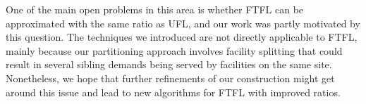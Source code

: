 \documentclass[preprint,12pt]{elsarticle}
\begin{document}
One of the main open problems in this area is whether FTFL can be approximated with the
same ratio as UFL, and our work was partly motivated by this question. The techniques we
introduced are not directly applicable to FTFL, mainly because our partitioning
approach involves facility splitting that could result in several sibling demands being served
by facilities on the same site. Nonetheless, we hope that further refinements of 
our construction might get around this issue and
lead to new algorithms for FTFL with improved ratios.
\pagebreak




\pagebreak

\appendix


\end{document}
